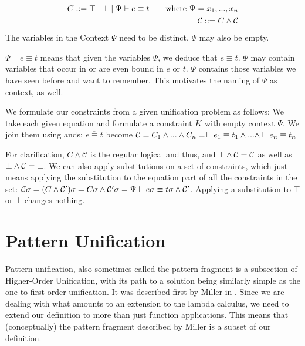 \documentclass[twoside,12pt,a4paper]{article}
\begin{document}
\begin{definition}[Constraint]
    \begin{align*}
        C ::= \top \;|\; \bot \;|\; \Psi \vdash e\equiv t \tag*{where $\Psi = x_1, ..., x_n$}\\
        \mathcal{C} ::= C \wedge \mathcal{C}
    \end{align*}
    The variables in the Context $\Psi$ need to be distinct. $\Psi$ may also be empty.
\end{definition}
$\Psi \vdash e\equiv t$ means that given the variables $\Psi$, we deduce that $e\equiv t$.
$\Psi$ may contain variables that occur in or are even bound in $e$ or $t$. 
$\Psi$ contains those variables we have seen before and want to remember. This motivates the naming of $\Psi$ as context, as well.

We formulate our constraints from a given unification problem as follows:
We take each given equation and formulate a constraint $K$ with empty context $\Psi$. We join them using ands:
$\overline{e\equiv t}$ become $\mathcal{C} = C_1 \wedge ... \wedge C_n = \, \vdash e_1 \equiv t_1 \wedge ...\wedge \vdash e_n \equiv t_n $  

For clarification, $C \wedge \mathcal{C}$ is the regular logical and thus, 
and $\top \wedge \mathcal{C} = \mathcal{C}$ as well as $\bot \wedge \mathcal{C} = \bot$.
We can also apply substitutions on a set of constraints, which just means applying the substitution to the equation part of all the constraints in the set:
$\mathcal{C} \sigma = (C \wedge \mathcal{C}')\sigma = C \sigma \wedge \mathcal{C}' \sigma  
= \Psi \vdash e\sigma\equiv t\sigma\wedge \mathcal{C}'$. Applying a substitution to $\top$ or $\bot$ changes nothing.

\section{Pattern Unification}

Pattern unification, also sometimes called the pattern fragment
is a subsection of Higher-Order Unification, with its path to a solution being similarly simple as the one to first-order unification.
It was described first by Miller in \cite{10.1093/logcom/1.4.497}.
Since we are dealing with what amounts to an extension to the lambda calculus, we need to extend our definition to more than just function applications. 
This means that (conceptually) the pattern fragment described by Miller is a subset of our definition.
\end{document}
